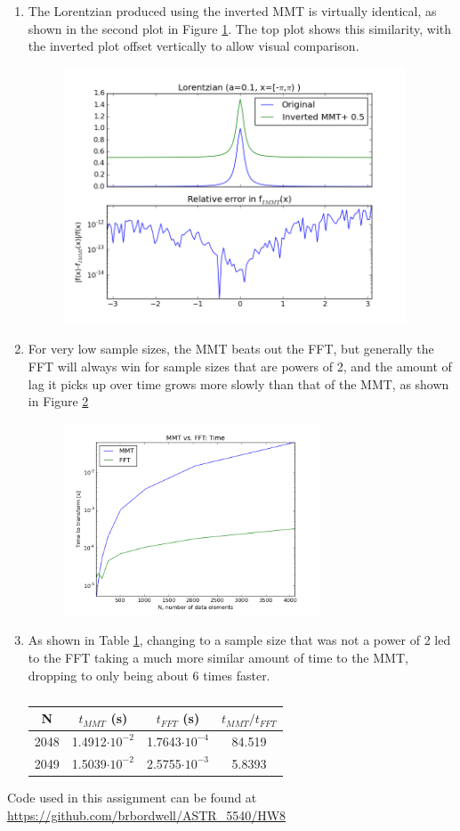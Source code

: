\documentclass[10pt, preprint]{aastex}
\begin{document}
\begin{enumerate}
\item The Lorentzian produced using the inverted MMT is virtually identical, as shown in the second plot in Figure \ref{fig3}. The top plot shows this similarity, with the inverted plot offset vertically to allow visual comparison.
\begin{figure}[!ht]
\centering
\includegraphics[width=4in]{hw8_fig3.png}
\caption{\centering \label{fig3}}
\end{figure}

\item For very low sample sizes, the MMT beats out the FFT, but generally the FFT will always win for sample sizes that are powers of 2, and the amount of lag it picks up over time grows more slowly than that of the MMT, as shown in Figure \ref{fig4}
\begin{figure}[!ht]
\centering
\includegraphics[width=3in]{hw8_fig4.png}
\caption{\centering \label{fig4}}
\end{figure}


\item As shown in Table \ref{tab1}, changing to a sample size that was not a power of 2 led to the FFT taking a much more similar amount of time to the MMT, dropping to only being about 6 times faster.
\begin{table}[!ht]
\centering
\begin{tabular}{c c c c}
  N & $t_{MMT}$ (s) & $t_{FFT}$ (s) & $t_{MMT}/t_{FFT}$\\
  \hline
  2048 & 1.4912$\cdot10^{-2}$ & 1.7643$\cdot10^{-4}$ & 84.519\\
  2049 & 1.5039$\cdot10^{-2}$ & 2.5755$\cdot10^{-3}$ & 5.8393\\
\end{tabular}
\caption{\centering \label{tab1}}
\end{table}
\end{enumerate}

Code used in this assignment can be found at \url{https://github.com/brbordwell/ASTR_5540/HW8}
\end{document}
